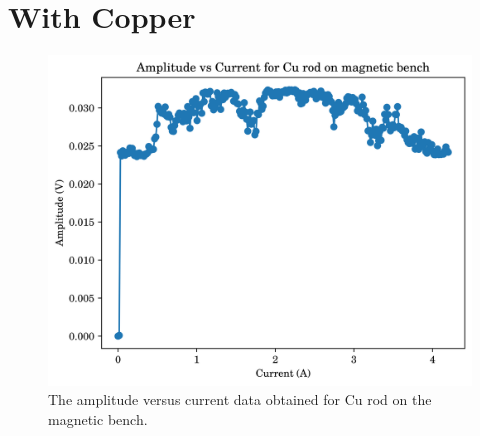 \section{With Copper}
\begin{figure}
	\centering
	\includegraphics{data/mb-Cu-0}
	\caption{The amplitude versus current data obtained for Cu rod on the magnetic bench.}
	\label{fig:mb-cu-0}
\end{figure}

\setcounter{equation}{0}
\setcounter{table}{0}
\setcounter{figure}{0}
